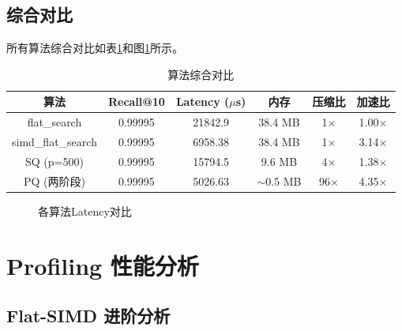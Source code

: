 \documentclass[a4paper]{article}
\begin{document}
\subsection{综合对比}

所有算法综合对比如表\ref{table:all_results}和图\ref{fig:all_comparison}所示。

\begin{table}[!htbp]
  \centering
  \begin{tabular}{cccccc}
  \toprule  
  \textbf{算法} & \textbf{Recall@10} & \textbf{Latency ($\mu$s)} & \textbf{内存} & \textbf{压缩比} & \textbf{加速比} \\
  \midrule
  flat\_search & 0.99995 & 21842.9 & 38.4 MB & 1$\times$ & 1.00$\times$ \\
  simd\_flat\_search & 0.99995 & 6958.38 & 38.4 MB & 1$\times$ & 3.14$\times$ \\
  SQ (p=500) & 0.99995 & 15794.5 & 9.6 MB & 4$\times$ & 1.38$\times$ \\
  PQ (两阶段) & 0.99995 & 5026.63 & $\sim$0.5 MB & 96$\times$ & 4.35$\times$ \\
  \bottomrule
  \end{tabular}
  \caption{算法综合对比}
  \label{table:all_results}
\end{table}

\begin{figure}[H]
\centering
{}
\caption{各算法Latency对比}
\label{fig:all_comparison}
\end{figure}

\section{Profiling 性能分析}

\subsection{Flat-SIMD 进阶分析}
\end{document}
